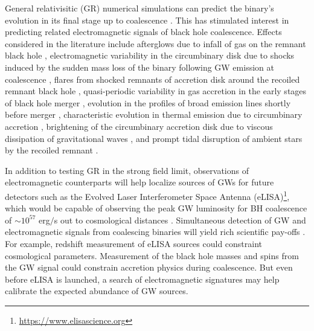 \documentclass[a4paper,fleqn,usenatbib]{mnras}
\begin{document}
General relativisitic (GR) numerical simulations can predict the
binary's evolution in its final stage up to coalescence
\citep{2005PhRvL..95l1101P, 2006PhRvL..96k1102B, 2006PhRvL..96k1101C}.
This has stimulated interest in predicting related electromagnetic
signals of black hole coalescence.  Effects considered in the
literature include afterglows due to infall of gas on the remnant
black hole \citep{2005ApJ...622L..93M}, electromagnetic variability in
the circumbinary disk due to shocks induced by the sudden mass loss of
the binary following GW emission at coalescence
\citep{2007APS..APR.S1010B}, flares from shocked remnants of accretion
disk around the recoiled remnant black hole
\citep{2007PhRvL..99d1103L, 2008ApJ...682..758S, 2009CQGra..26i4032H},
quasi-periodic variability in gas accretion in the early stages of
black hole merger \citep{2008ApJ...672...83M, 2009CQGra..26i4032H,
  2012MNRAS.427.2680K}, evolution in the profiles of broad emission
lines shortly before merger \citep{2013MNRAS.432.1468M},
characteristic evolution in thermal emission due to circumbinary
accretion \citep{2015MNRAS.446L..36F}, brightening of the circumbinary
accretion disk due to viscous dissipation of gravitational waves
\citep{2008PhRvL.101d1101K}, and prompt tidal disruption of ambient
stars by the recoiled remnant \citep{2011MNRAS.412...75S}. 

In addition to testing GR in the strong field limit, observations of
electromagnetic counterparts will help localize sources of GWs for
future detectors such as the Evolved Laser Interferometer Space
Antenna (eLISA)\footnote{\url{https://www.elisascience.org}}, which
would be capable of observing the peak GW luminosity for BH
coalescence of $\sim 10^{57}$ erg$/$s out to cosmological distances
\citep{2003CQGra..20S..65H, 2013CQGra..30x4009S}.  Simultaneous
detection of GW and electromagnetic signals from coalescing binaries
will yield rich scientific pay-offs \citep{2003CQGra..20S..65H,
  2005ApJ...629...15H}.  For example, redshift measurement of eLISA
sources could constraint cosmological parameters.  Measurement of the
black hole masses and spins from the GW signal could constrain
accretion physics during coalescence.  But even before eLISA is
launched, a search of electromagnetic signatures may help calibrate
the expected abundance of GW sources.
\end{document}
